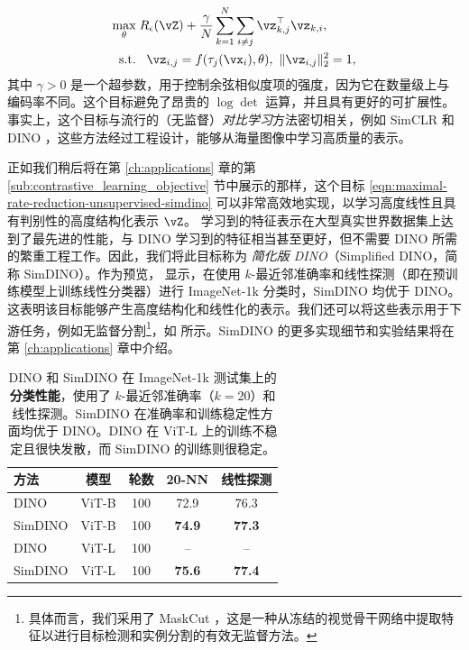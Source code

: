 \documentclass[../../book-main_zh.tex]{subfiles}
\begin{document}
\begin{equation}
    \begin{aligned}
        \max_{\theta } & \;  R_{\epsilon}(\vZ) +
        \frac{\gamma}{N}\sum_{k=1}^N \sum_{i \neq j}
        \vz_{k,j}^\top \vz_{k,i}, \\
        \mbox{s.t.} &  \ \ \, \vz_{i,j} = f(\tau_j(\vx_i),\theta),\
        \|\vz_{i,j}\|_2^2                                          = 1,
    \end{aligned}
    \label{eqn:maximal-rate-reduction-unsupervised-simdino}
\end{equation}
其中 $\gamma > 0$ 是一个超参数，用于控制余弦相似度项的强度，因为它在数量级上与编码率不同。这个目标避免了昂贵的 $\log \det$ 运算，并且具有更好的可扩展性。事实上，这个目标与流行的（无监督）{\em 对比学习}方法密切相关，例如 SimCLR \cite{chen2020simple} 和 DINO \cite{caron2021emerging}，这些方法经过工程设计，能够从海量图像中学习高质量的表示。

正如我们稍后将在第 \ref{ch:applications} 章的第 \ref{sub:contrastive_learning_objective} 节中展示的那样，这个目标 \eqref{eqn:maximal-rate-reduction-unsupervised-simdino} 可以非常高效地实现，以学习高度线性且具有判别性的高度结构化表示 $\vZ$。
学习到的特征表示在大型真实世界数据集上达到了最先进的性能，与 DINO 学习到的特征相当甚至更好，但不需要 DINO 所需的繁重工程工作。因此，我们将此目标称为 {\em 简化版 DINO}（Simplified DINO，简称 SimDINO）。作为预览， 显示，在使用 \(k\)-最近邻准确率和线性探测（即在预训练模型上训练线性分类器）进行 ImageNet-1k 分类时，SimDINO 均优于 DINO。这表明该目标能够产生高度结构化和线性化的表示。我们还可以将这些表示用于下游任务，例如无监督分割\footnote{具体而言，我们采用了 MaskCut \cite{wang2023cut}，这是一种从冻结的视觉骨干网络中提取特征以进行目标检测和实例分割的有效无监督方法。}，如  所示。SimDINO 的更多实现细节和实验结果将在第 \ref{ch:applications} 章中介绍。

\begin{table}
    \centering
    \begin{tabular}{@{}lcccc@{}} %
        \toprule
        方法 & 模型 & 轮数 & 20-NN & 线性探测
        \\
        \midrule
        DINO & ViT-B & 100 & 72.9 & 76.3 \\
        SimDINO & ViT-B & 100 & \bf 74.9 & \bf 77.3 \\
        DINO & ViT-L & 100 & -- & -- \\
        SimDINO & ViT-L & 100 & \bf 75.6 & \bf 77.4 \\

        \bottomrule
    \end{tabular}\smallskip
    \caption{\small DINO 和 SimDINO 在 ImageNet-1k 测试集上的\textbf{分类性能}，使用了 \(k\)-最近邻准确率（\(k = 20\)）和线性探测。SimDINO 在准确率和训练稳定性方面均优于 DINO。DINO 在 ViT-L 上的训练不稳定且很快发散，而 SimDINO 的训练则很稳定。}
    \label{tab:dino_imagenet_linear_probing_teaser}
\end{table}
\end{document}
